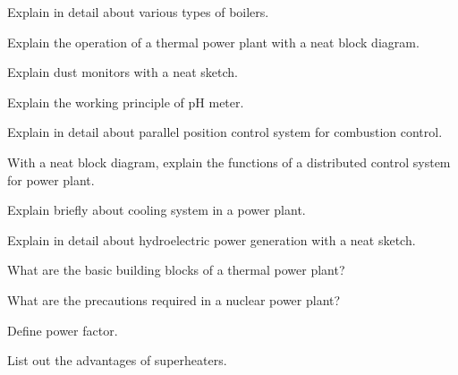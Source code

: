 \markB
\partC

\item \iitem Explain in detail about various types of boilers.

\Or

\item Explain the operation of a thermal power plant with a neat block diagram.

\ene

\item \iitem Explain dust monitors with a neat sketch.

\newpage \again

\Or

\item Explain the working principle of pH meter.

\ene


\item \iitem Explain in detail about parallel position control system for combustion control.

\Or

\item With a neat block diagram, explain the functions of a distributed control system for 
  power plant.      

\ene

\item \iitem Explain briefly about cooling system in a power plant.

\Or


\item Explain in detail about hydroelectric power generation with a neat sketch.

\ene

\markC

\ene


\newpage




\sub{\subj}

\maxtime


\partA


\iitem What are the basic building blocks of a thermal power plant?

\item What are the precautions required in a nuclear power plant?

\item Define power factor.

\item List out the advantages of superheaters.

